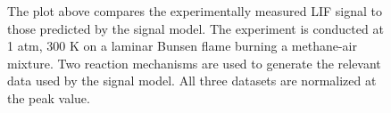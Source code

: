\begin{figure}

\centering



\caption[Validation of LIF signal model]{The plot above compares the experimentally measured LIF signal to those predicted by the signal model. The experiment is conducted at 1 atm, 300 K on a laminar Bunsen flame burning a methane-air mixture. Two reaction mechanisms are used to generate the relevant data used by the signal model. All three datasets are normalized at the peak value.}

\label{fig:chPLIFSignalExperiment}

\end{figure}

